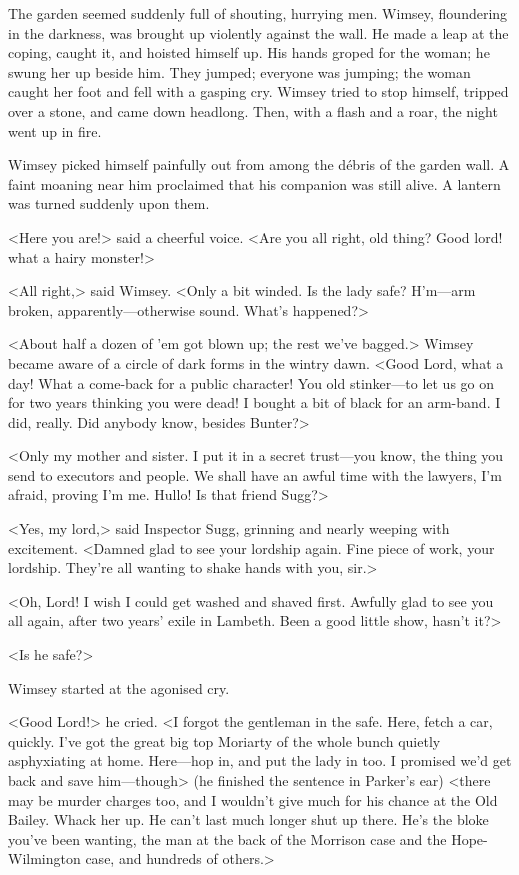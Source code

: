 The garden seemed suddenly full of shouting, hurrying men. Wimsey, floundering in the darkness, was brought up violently against the wall. He made a leap at the coping, caught it, and hoisted himself up. His hands groped for the woman; he swung her up beside him. They jumped; everyone was jumping; the woman caught her foot and fell with a gasping cry. Wimsey tried to stop himself, tripped over a stone, and came down headlong. Then, with a flash and a roar, the night went up in fire.

Wimsey picked himself painfully out from among the débris of the garden wall. A faint moaning near him proclaimed that his companion was still alive. A lantern was turned suddenly upon them.

<Here you are!> said a cheerful voice. <Are you all right, old thing? Good lord! what a hairy monster!>

<All right,> said Wimsey. <Only a bit winded. Is the lady safe? H'm—arm broken, apparently—otherwise sound. What's happened?>

<About half a dozen of 'em got blown up; the rest we've bagged.> Wimsey became aware of a circle of dark forms in the wintry dawn. <Good Lord, what a day! What a come-back for a public character! You old stinker—to let us go on for two years thinking you were dead! I bought a bit of black for an arm-band. I did, really. Did anybody know, besides Bunter?>

<Only my mother and sister. I put it in a secret trust—you know, the thing you send to executors and people. We shall have an awful time with the lawyers, I'm afraid, proving I'm me. Hullo! Is that friend Sugg?>

<Yes, my lord,> said Inspector Sugg, grinning and nearly weeping with excitement. <Damned glad to see your lordship again. Fine piece of work, your lordship. They're all wanting to shake hands with you, sir.>

<Oh, Lord! I wish I could get washed and shaved first. Awfully glad to see you all again, after two years' exile in Lambeth. Been a good little show, hasn't it?>

<Is he safe?>

Wimsey started at the agonised cry.

<Good Lord!> he cried. <I forgot the gentleman in the safe. Here, fetch a car, quickly. I've got the great big top Moriarty of the whole bunch quietly asphyxiating at home. Here—hop in, and put the lady in too. I promised we'd get back and save him—though> (he finished the sentence in Parker's ear) <there may be murder charges too, and I wouldn't give much for his chance at the Old Bailey. Whack her up. He can't last much longer shut up there. He's the bloke you've been wanting, the man at the back of the Morrison case and the Hope-Wilmington case, and hundreds of others.>

